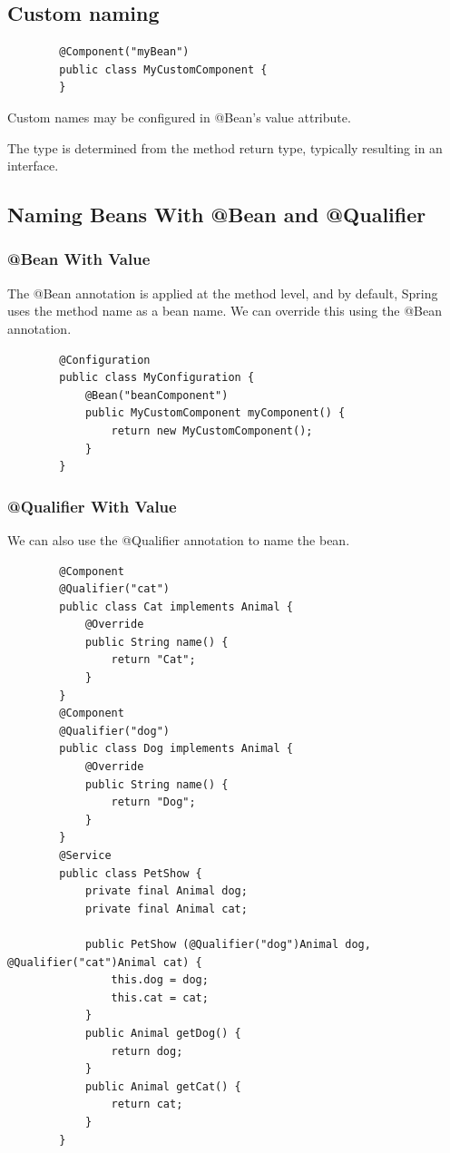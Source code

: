 \documentclass{scrartcl}
\begin{document}
\subsection{Custom naming}

    \begin{lstlisting}
        @Component("myBean")
        public class MyCustomComponent {
        }
    \end{lstlisting}

   Custom names may be configured in @Bean's value attribute.

   The type is determined from the method return type, typically resulting in an interface.

\subsection{Naming Beans With @Bean and @Qualifier}
\subsubsection{@Bean With Value}
    The @Bean annotation is applied at the method level, and by default, Spring uses the method name as a bean name. We can override this using the @Bean annotation.

     \begin{lstlisting}
        @Configuration
        public class MyConfiguration {
            @Bean("beanComponent")
            public MyCustomComponent myComponent() {
                return new MyCustomComponent();
            }
        }
    \end{lstlisting}

\subsubsection{@Qualifier With Value}
    We can also use the @Qualifier annotation to name the bean.

    \begin{lstlisting}
        @Component
        @Qualifier("cat")
        public class Cat implements Animal {
            @Override
            public String name() {
                return "Cat";
            }
        }
        @Component
        @Qualifier("dog")
        public class Dog implements Animal {
            @Override
            public String name() {
                return "Dog";
            }
        }
        @Service
        public class PetShow {
            private final Animal dog;
            private final Animal cat;

            public PetShow (@Qualifier("dog")Animal dog, @Qualifier("cat")Animal cat) {
                this.dog = dog;
                this.cat = cat;
            }
            public Animal getDog() {
                return dog;
            }
            public Animal getCat() {
                return cat;
            }
        }
        \end{lstlisting}
\end{document}
